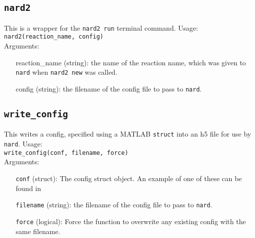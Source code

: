 \documentclass[11pt]{article}
\begin{document}
    \subsection[\texttt{nard2}]{\texttt{nard2}}
    This is a wrapper for the \texttt{nard2 run} terminal command.
    Usage:\\
    \texttt{nard2(reaction\_name, config)}\\
    Arguments:
    \begin{itemize}
        \item[reaction\_name] (string): the name of the reaction name, which was given to \texttt{nard} when \texttt{nard2 new} was called.
        \item[config] (string): the filename of the config file to pass to \texttt{nard}.
    \end{itemize}

    \subsection[\texttt{write\_config}]{\texttt{write\_config}}
    This writes a config, specified using a MATLAB \texttt{struct} into an h5 file for use by \texttt{nard}.
    Usage:\\
    \texttt{write\_config(conf, filename, force)}\\
    Arguments:
    \begin{itemize}
        \item[\texttt{conf}] (struct): The config struct object. An example of one of these can be found in
        \item[\texttt{filename}] (string): the filename of the config file to pass to \texttt{nard}.
        \item[\texttt{force}] (logical): Force the function to overwrite any existing config with the same filename.
    \end{itemize}
\end{document}
